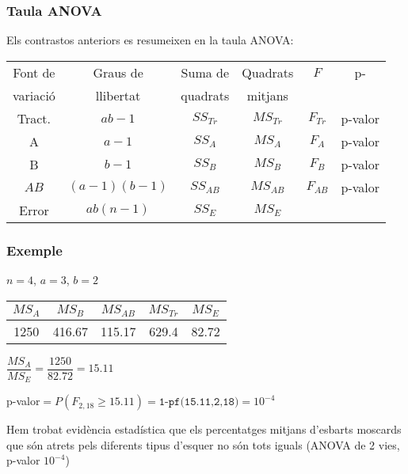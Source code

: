 \documentclass[12pt,t]{beamer}
\renewcommand{\geq}{\geqslant}
\theoremstyle{plain}
\theoremstyle{definition}
\begin{document}
\begin{frame}
\frametitle{Taula  ANOVA}

Els contrastos anteriors es resumeixen en la taula  ANOVA:

{\small \begin{center}
\begin{tabular}{cccccc}
\hline
 Font de& Graus de& Suma de& Quadrats& $F$ & p- \\
variació&llibertat&quadrats&mitjans& &\\\hline
Tract.&$ab-1$&$SS_{Tr}$&$MS_{Tr}$& $F_{Tr}$ & p-valor \\[1ex]
A&$a-1$&$SS_A$&$MS_{A}$& $F_{A}$&  p-valor\\[1ex]
B&$b-1$&$SS_B$&$MS_{B}$& $F_{B}$&  p-valor\\[1ex]
$AB$& {$(a-1)(b-1)$} &$SS_{AB}$&$MS_{AB}$& $F_{AB}$&  p-valor\\[1ex]
Error&$ab(n-1)$&$SS_E$&$MS_{E}$&& \\\hline
\end{tabular}
\end{center}
}
\end{frame}


\begin{frame}
\frametitle{Exemple}

$n=4$, $a=3$, $b=2$
\medskip

\begin{center}
\begin{tabular}{ccccc}
$MS_A$ & $MS_B$ & $MS_{AB}$ & $MS_{Tr}$ & $MS_E$\\ \hline
1250 &  416.67 &  115.17 & 629.4 &   82.72
\end{tabular}
\end{center}

$\dfrac{MS_{A}}{MS_E}=\dfrac{1250}{82.72}=15.11$\medskip 

p-valor$=P(F_{2,18}\geq 15.11)=\texttt{1-pf(15.11,2,18)}=10^{-4}$
\bigskip

Hem trobat evidència estadística que els percentatges mitjans d'esbarts moscards que són atrets pels diferents tipus d'esquer no són tots iguals (ANOVA de 2 vies, p-valor $10^{-4}$)

\end{frame}
\end{document}
